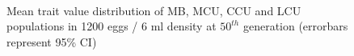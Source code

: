 \begin{figure}[p]
{  }\\
  \caption{Mean trait value distribution of MB, MCU, CCU and LCU populations in 1200 eggs / 6 ml density at $50^{th}$ generation (errorbars represent 95\% CI) }
  \label{fig:lh_lcu_culture}
\end{figure}
\clearpage

